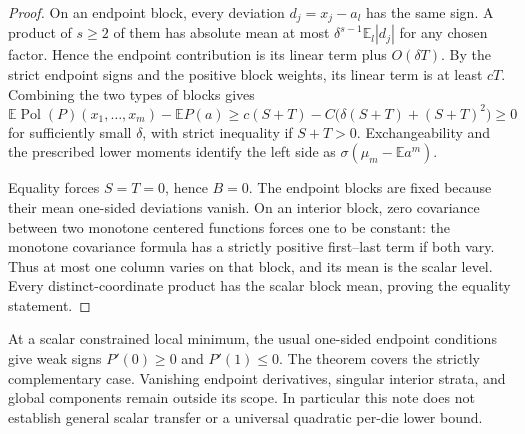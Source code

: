 \documentclass[11pt]{article}
\newcommand{\E}{\mathbb E}
\begin{document}
\begin{proof}
On an endpoint block, every deviation $d_j=x_j-a_l$ has the same
sign. A product of $s\ge2$ of them has absolute mean at most
$\delta^{s-1}\E_l|d_j|$ for any chosen factor. Hence the endpoint
contribution is its linear term plus $O(\delta T)$. By the strict
endpoint signs and the positive block weights, its linear term is
at least $cT$.
Combining the two types of blocks gives
\[
 \E\operatorname{Pol}(P)(x_1,\ldots,x_m)-\E P(a)
 \ge c(S+T)-C\bigl(\delta(S+T)+(S+T)^2\bigr)\ge0
\]
for sufficiently small $\delta$, with strict inequality if $S+T>0$.
Exchangeability and the prescribed lower moments identify the left
side as $\sigma(\mu_m-\E a^m)$.

Equality forces $S=T=0$, hence $B=0$. The endpoint blocks are fixed
because their mean one-sided deviations vanish. On an interior block,
zero covariance between two monotone centered functions forces one to
be constant: the monotone covariance formula has a strictly positive
first--last term if both vary. Thus at most one column varies on that
block, and its mean is the scalar level. Every distinct-coordinate
product has the scalar block mean, proving the equality statement.
\end{proof}

At a scalar constrained local minimum, the usual one-sided endpoint
conditions give weak signs $P'(0)\ge0$ and $P'(1)\le0$. The theorem
covers the strictly complementary case. Vanishing endpoint derivatives,
singular interior strata, and global components remain outside its
scope. In particular this note does not establish general scalar
transfer or a universal quadratic per-die lower bound.
\end{document}

